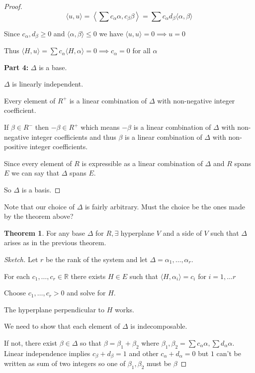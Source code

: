 \documentclass{article}
\theoremstyle{definition}
\newtheorem{theorem}{Theorem}
\begin{document}
\begin{proof}
    \[
        \langle u,u \rangle = \left\langle \sum c_\alpha \alpha  , c_\beta \beta \right\rangle = \sum c_\alpha d_\beta \langle \alpha ,\beta \rangle  
    \]

    Since \(c_\alpha ,d_\beta \geq 0\) and \(\langle \alpha ,\beta  \rangle \leq 0\) we have \(\langle u,u \rangle =0 \implies u=0\) 

    Thus \(\langle H,u \rangle = \sum c_\alpha \langle H,\alpha \rangle = 0 \implies c_\alpha = 0 \) for all \(\alpha\) 

    \textbf{Part 4:} \(\Delta\) is a base.

    \(\Delta\) is linearly independent.

    Every element of \(R^+\) is a linear combination of \(\Delta\) with non-negative integer coefficient.

    If \(\beta \in R^-\) then \(-\beta \in R^+\) which means \(-\beta\) is a linear combination of \(\Delta\) with non-negative integer coefficients and thus \(\beta \) is a linear combination of \(\Delta \) with non-positive integer coefficients.

    Since every element of \(R\) is expressible as a linear combination of \(\Delta\) and \(R\) spans \(E\) we can say that \(\Delta\) spans \(E\).

    So \(\Delta\) is a basis.

\end{proof}

Note that our choice of \(\Delta\) is fairly arbitrary. Must the choice be the ones made by the theorem above?

\begin{theorem}
    For any base \(\Delta\) for \(R,\exists \) hyperplane \(V\) and a side of \(V\) such that \(\Delta\) arises as in the previous theorem.
\end{theorem}

\begin{proof}
    [Sketch]

    Let \(r\) be the rank of the system and let \(\Delta = \alpha _1, \dots , \alpha _r \).
    
    For each \(c_1, \dots ,c_r\in \mathbb{R}\) there exists \(H\in E\) such that \(\langle H,\alpha _i \rangle = c_i\) for \(i = 1,\dots r\) 

    Choose \(c_1 , \dots , c_r > 0\) and solve for \(H\).

    The hyperplane perpendicular to \(H\) works.

    We need to show that each element of \(\Delta\) is indecomposable.

    If not, there exist \(\beta\in \Delta\) so that \(\beta = \beta_1 + \beta_2\) where \(\beta_1,\beta_2 = \sum c_\alpha \alpha , \sum d_\alpha \alpha  \). Linear independence implies \(c_\beta + d_\beta =1\) and other \(c_\alpha +d_\alpha =0\) but \(1\) can't be written as sum of two integers so one of \(\beta _1,\beta _2\) must be \(\beta\) 
\end{proof}
\end{document}
